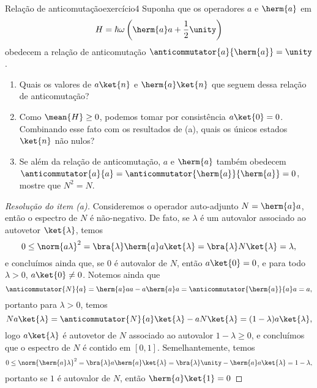\begin{exercício}{Relação de anticomutação}{exercício4}
    Suponha que os operadores \(a\) e \(\herm{a}\) em
    \begin{equation*}
        H = \hbar \omega \left(\herm{a}a + \frac12\unity\right)
    \end{equation*}
    obedecem a relação de anticomutação \(\anticommutator{a}{\herm{a}} = \unity\).
    \begin{enumerate}[label=(\alph*)]
        \item Quais os valores de \(a\ket{n}\) e \(\herm{a}\ket{n}\) que seguem dessa relação de anticomutação?
        \item Como \(\mean{H} \geq 0\), podemos tomar por consistência \(a\ket{0} = 0\). Combinando esse fato com os resultados de (a), quais os únicos estados \(\ket{n}\) não nulos?
        \item Se além da relação de anticomutação, \(a\) e \(\herm{a}\) também obedecem \(\anticommutator{a}{a} = \anticommutator{\herm{a}}{\herm{a}} = 0\), mostre que \(N^2 = N\).
    \end{enumerate}
\end{exercício}
\begin{proof}[Resolução do item (a)]
    Consideremos o operador auto-adjunto \(N = \herm{a}a\), então o espectro de \(N\) é não-negativo. De fato, se \(\lambda\) é um autovalor associado ao autovetor \(\ket{\lambda}\), temos
    \begin{equation*}
        0 \leq \norm{a \lambda}^2 = \bra{\lambda}\herm{a}a\ket{\lambda} = \bra{\lambda}N\ket{\lambda} = \lambda,
    \end{equation*}
    e concluímos ainda que, se \(0\) é autovalor de \(N\), então \(a \ket{0} = 0\), e para todo \(\lambda > 0\), \(a\ket{0} \neq 0\). Notemos ainda que
    \begin{equation*}
        \anticommutator{N}{a} = \herm{a}aa - a\herm{a}a = \anticommutator{\herm{a}}{a}a = a,
    \end{equation*}
    portanto para \(\lambda > 0\), temos
    \begin{equation*}
        N a\ket{\lambda} = \anticommutator{N}{a} \ket{\lambda} - a N \ket{\lambda} = (1 - \lambda)a \ket{\lambda},
    \end{equation*}
    logo \(a \ket{\lambda}\) é autovetor de \(N\) associado ao autovalor \(1 - \lambda \geq 0\), e concluímos que o espectro de \(N\) é contido em \([0,1]\). Semelhantemente, temos
    \begin{equation*}
        0 \leq \norm{\herm{a}\lambda}^2 = \bra{\lambda}a\herm{a}\ket{\lambda} = \bra{\lambda}\unity - \herm{a}a\ket{\lambda} = 1 - \lambda,
    \end{equation*}
    portanto se \(1\) é autovalor de \(N\), então \(\herm{a}\ket{1} = 0\)
\end{proof}
